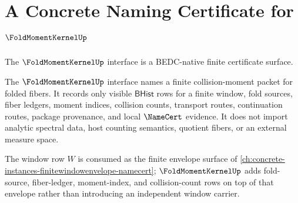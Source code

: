 \chapter{A Concrete Naming Certificate for $\FoldMomentKernelUp$}
\label{ch:concrete-instances-fold-moment-kernel-namecert}

The $\FoldMomentKernelUp$ interface is a BEDC-native finite certificate surface.

The $\FoldMomentKernelUp$ interface names a finite collision-moment packet for
folded fibers. It records only visible $\mathsf{BHist}$ rows for a finite
window, fold sources, fiber ledgers, moment indices, collision counts,
transport routes, continuation routes, package provenance, and local
$\NameCert$ evidence. It does not import analytic spectral data, host counting
semantics, quotient fibers, or an external measure space.

The window row $W$ is consumed as the finite envelope surface of
\autoref{ch:concrete-instances-finitewindowenvelope-namecert};
$\FoldMomentKernelUp$ adds fold-source, fiber-ledger, moment-index, and
collision-count rows on top of that envelope rather than introducing an
independent window carrier.

